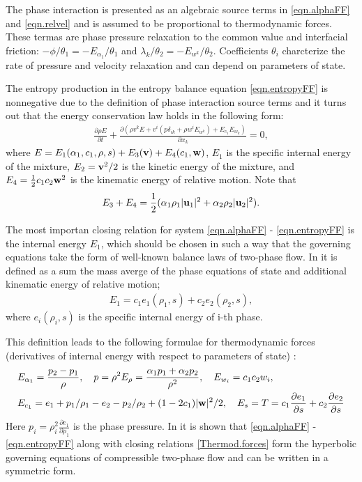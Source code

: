 \documentclass[3p,times]{elsarticle}
\begin{document}
The phase interaction is presented as an algebraic source terms in \eqref{eqn.alphaFF} and \eqref{eqn.relvel} and is assumed to be proportional to thermodynamic forces. These termas are phase pressure relaxation to the common value and interfacial friction: $-{\phi}/{\theta_1}=-{E_{\alpha_1}}/{\theta_1}$ and ${\lambda_{k} }/{\theta_2}=-{E_{w^k}}/{\theta_2}$. Coefficients $\theta_i$ charcterize the rate of pressure and velocity relaxation and can depend on parameters of state.

The entropy production in the entropy balance equation \eqref{eqn.entropyFF} is nonnegative due to the definition of phase interaction source terms and it turns out that the energy conservation law holds in the following form:
\begin{align} \label{eqn.energyFF}
\displaystyle\frac{\partial \rho E}{\partial t}+
\frac{\partial \left(\rho  v^k E +v^i(p \delta_{ik}+\rho w^i E_{w^k}) +E_{c_1}E_{w_k} \right)}{\partial x_k}=0,
\end{align}
where $E=E_1(\alpha_1, c_1, \rho, s)+E_3({\bf v})+E_4({c_1,\bf w})$, $E_1$ is the specific internal energy of the mixture, $E_2={\bf v}^2/2$ is the kinetic energy of the mixture, and $E_4=\frac{1}{2}c_1c_2{\bf w}^2$ is the kinematic energy of relative motion.
Note that 
\begin{align}
E_3+E_4=\frac{1}{2}(\alpha_1\rho_1 |{\bf u}_1|^2+\alpha_2\rho_2 |{\bf u}_2|^2).
\end{align}

The most importan closing relation for system \eqref{eqn.alphaFF} - \eqref{eqn.entropyFF}
is the internal energy  $E_1$, which should be chosen in such a way that the governing equations  take the form of well-known balance laws of two-phase  flow. In \cite{} it is defined as a sum the mass averge of the phase equations of state and additional kinematic energy of relative motion;
\begin{align}
E_1=c_1e_1(\rho_1,s)+c_2e_2(\rho_2,s),
\end{align} 
where $e_i(\rho_i,s)$ is the specific internal energy of i-th phase.

This definition leads to the following formulae for thermodynamic forces (derivatives of internal energy with respect to parameters of state) \cite{}:
\begin{eqnarray} \label{Thermod.forces}
& E_{\alpha_1}=\frac{p_2-p_1}{\rho}, \quad p=\rho^2E_\rho=\frac{\alpha_1p_1+\alpha_2p_2}{\rho^2}, \quad E_{w_i}=c_1c_2 w_i, \\
& E_{c_1}=e_1+p_1/\rho_1-e_2-p_2/\rho_2+(1-2c_1)|{\bf w}|^2/2, \quad E_s=T=c_1\frac{\partial e_1}{\partial s}+c_2\frac{\partial e_2}{\partial s} \nonumber
\end{eqnarray}  
Here $p_i=\rho_i^2\frac{\partial e_1}{\partial \rho_1}$ is the phase pressure.
In \cite{} it is shown that \eqref{eqn.alphaFF} - \eqref{eqn.entropyFF} along with closing relations \eqref{Thermod.forces} form the hyperbolic governing equations of compressible two-phase flow and can be written in a symmetric form.
\end{document}
